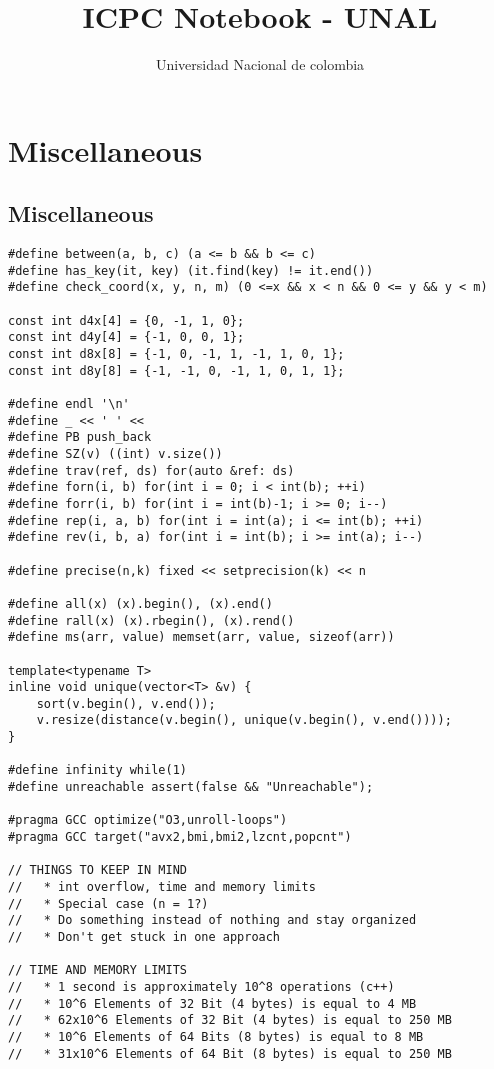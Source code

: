 \documentclass[10pt,letterpaper,twocolumn,twosided]{article}
\begin{document}
\title{ICPC Notebook - UNAL}
\author{Universidad Nacional de colombia}
\maketitle
\tableofcontents
{}

\section{Miscellaneous}

\subsection{Miscellaneous}
\begin{lstlisting}
#define between(a, b, c) (a <= b && b <= c)
#define has_key(it, key) (it.find(key) != it.end())
#define check_coord(x, y, n, m) (0 <=x && x < n && 0 <= y && y < m)

const int d4x[4] = {0, -1, 1, 0};
const int d4y[4] = {-1, 0, 0, 1};
const int d8x[8] = {-1, 0, -1, 1, -1, 1, 0, 1};
const int d8y[8] = {-1, -1, 0, -1, 1, 0, 1, 1};

#define endl '\n'
#define _ << ' ' <<
#define PB push_back
#define SZ(v) ((int) v.size())
#define trav(ref, ds) for(auto &ref: ds)
#define forn(i, b) for(int i = 0; i < int(b); ++i)
#define forr(i, b) for(int i = int(b)-1; i >= 0; i--)
#define rep(i, a, b) for(int i = int(a); i <= int(b); ++i)
#define rev(i, b, a) for(int i = int(b); i >= int(a); i--)

#define precise(n,k) fixed << setprecision(k) << n

#define all(x) (x).begin(), (x).end()
#define rall(x) (x).rbegin(), (x).rend()
#define ms(arr, value) memset(arr, value, sizeof(arr))

template<typename T>
inline void unique(vector<T> &v) {
    sort(v.begin(), v.end());
    v.resize(distance(v.begin(), unique(v.begin(), v.end())));
}

#define infinity while(1)
#define unreachable assert(false && "Unreachable");

#pragma GCC optimize("O3,unroll-loops")
#pragma GCC target("avx2,bmi,bmi2,lzcnt,popcnt")

// THINGS TO KEEP IN MIND
//   * int overflow, time and memory limits
//   * Special case (n = 1?)
//   * Do something instead of nothing and stay organized
//   * Don't get stuck in one approach
 
// TIME AND MEMORY LIMITS
//   * 1 second is approximately 10^8 operations (c++)
//   * 10^6 Elements of 32 Bit (4 bytes) is equal to 4 MB
//   * 62x10^6 Elements of 32 Bit (4 bytes) is equal to 250 MB
//   * 10^6 Elements of 64 Bits (8 bytes) is equal to 8 MB
//   * 31x10^6 Elements of 64 Bit (8 bytes) is equal to 250 MB


\end{lstlisting}
\end{document}
